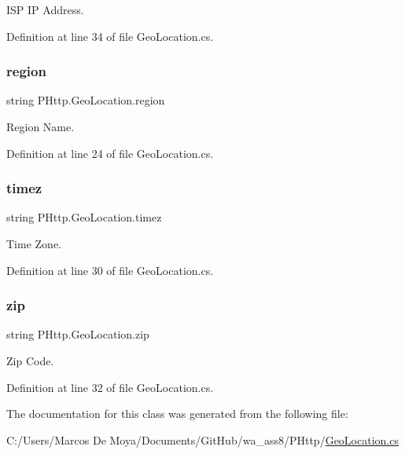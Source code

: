I\+SP IP Address. 



Definition at line 34 of file Geo\+Location.\+cs.

\mbox{\label{class_p_http_1_1_geo_location_a137fff36b7b5fc1e6ccde2c4994fe919}} 
\subsubsection{\texorpdfstring{region}{region}}
{\footnotesize\ttfamily string P\+Http.\+Geo\+Location.\+region\hspace{0.3cm}{\ttfamily [get]}}



Region Name. 



Definition at line 24 of file Geo\+Location.\+cs.

\mbox{\label{class_p_http_1_1_geo_location_adbd770cfca0c2ce6a9d4db195dc48fdc}} 
\subsubsection{\texorpdfstring{timez}{timez}}
{\footnotesize\ttfamily string P\+Http.\+Geo\+Location.\+timez\hspace{0.3cm}{\ttfamily [get]}}



Time Zone. 



Definition at line 30 of file Geo\+Location.\+cs.

\mbox{\label{class_p_http_1_1_geo_location_a650d84edf403cb551ea2ccc20d43f079}} 
\subsubsection{\texorpdfstring{zip}{zip}}
{\footnotesize\ttfamily string P\+Http.\+Geo\+Location.\+zip\hspace{0.3cm}{\ttfamily [get]}}



Zip Code. 



Definition at line 32 of file Geo\+Location.\+cs.



The documentation for this class was generated from the following file\+:\begin{DoxyCompactItemize}
\item 
C\+:/\+Users/\+Marcos De Moya/\+Documents/\+Git\+Hub/wa\+\_\+ass8/\+P\+Http/\hyperlink{_geo_location_8cs}{Geo\+Location.\+cs}\end{DoxyCompactItemize}
